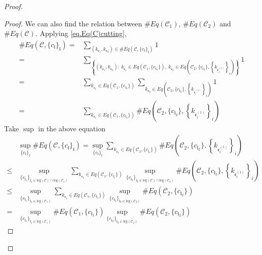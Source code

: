 \begin{proof}
\begin{proof}
We can also find the relation between $\#Eq(\mathcal{C}_1)$, $\#Eq(\mathcal{C}_2)$ and $\#Eq(\mathcal{C})$. Applying \eqref{eq.Eq(C)cutting},
\begin{equation}
\begin{split}
    \#Eq(\mathcal{C},\{c_{\mathfrak{l}}\}_{\mathfrak{l}})=&\sum_{(k_{\mathfrak{e}_1},k_{\mathfrak{e}_{2}})\in \#Eq(\mathcal{C},\{c_{\mathfrak{l}}\}_{\mathfrak{l}})} 1
    \\
    =&\sum_{\left\{(k_{\mathfrak{e}_1},k_{\mathfrak{e}_{2}}):\ k_{\mathfrak{e}_1}\in Eq(\mathcal{C}_1,\{c_{\mathfrak{l}_1}\}),\  k_{\mathfrak{e}_{2}}\in Eq\left(\mathcal{C}_{2}, \{c_{\mathfrak{l}_2}\}, \left\{k_{\mathfrak{e}_{i}^{(1)}}\right\}_{i}\right)\right\}} 1
    \\
    =&\sum_{k_{\mathfrak{e}_1}\in Eq(\mathcal{C}_1,\{c_{\mathfrak{l}_1}\})} \sum_{k_{\mathfrak{e}_{2}}\in Eq\left(\mathcal{C}_{2}, \{c_{\mathfrak{l}_2}\}, \left\{k_{\mathfrak{e}_{i}^{(1)}}\right\}_{i}\right)} 1
    \\
    =&\sum_{k_{\mathfrak{e}_1}\in Eq(\mathcal{C}_1,\{c_{\mathfrak{l}_1}\})} \# Eq\left(\mathcal{C}_{2}, \{c_{\mathfrak{l}_2}\}, \left\{k_{\mathfrak{e}_{i}^{(1)}}\right\}_{i}\right)
\end{split}
\end{equation}
Take $\sup$ in the above equation
\begin{equation}
\begin{split}
    &\sup_{\{c_{\mathfrak{l}}\}_{\mathfrak{l}}}\#Eq(\mathcal{C},\{c_{\mathfrak{l}}\}_{\mathfrak{l}})
    =\sup_{\{c_{\mathfrak{l}}\}_{\mathfrak{l}}}\sum_{k_{\mathfrak{e}_1}\in Eq(\mathcal{C}_1,\{c_{\mathfrak{l}_1}\})} \# Eq\left(\mathcal{C}_{2}, \{c_{\mathfrak{l}_2}\}, \left\{k_{\mathfrak{e}_{i}^{(1)}}\right\}_{i}\right)
    \\
    \le &\sup_{\{c_{\mathfrak{l}_1}\}_{\mathfrak{l}_1\in \text{leg}(\mathcal{C})\cap \text{leg}(\mathcal{C}_1)} }\sum_{k_{\mathfrak{e}_1}\in Eq(\mathcal{C}_1,\{c_{\mathfrak{l}_1}\})} \sup_{\{c_{\mathfrak{l}_2}\}_{\mathfrak{l}_2\in \text{leg}(\mathcal{C})\cap \text{leg}(\mathcal{C}_2)} }\# Eq\left(\mathcal{C}_{2}, \{c_{\mathfrak{l}_2}\}, \left\{k_{\mathfrak{e}_{i}^{(1)}}\right\}_{i}\right)
    \\
    \le &\sup_{\{c_{\mathfrak{l}_1}\}_{\mathfrak{l}_1\in \text{leg}(\mathcal{C}_1)} }\sum_{k_{\mathfrak{e}_1}\in Eq(\mathcal{C}_1,\{c_{\mathfrak{l}_1}\})} \sup_{\{c_{\mathfrak{l}_2}\}_{\mathfrak{l}_2\in \text{leg}(\mathcal{C}_2)} }\# Eq(\mathcal{C}_{2}, \{c_{\mathfrak{l}_2}\})
    \\
    = &\sup_{\{c_{\mathfrak{l}_1}\}_{\mathfrak{l}_1\in \text{leg}(\mathcal{C}_1)} } \# Eq(\mathcal{C}_1,\{c_{\mathfrak{l}_1}\}) \sup_{\{c_{\mathfrak{l}_2}\}_{\mathfrak{l}_2\in \text{leg}(\mathcal{C}_2)} }\# Eq(\mathcal{C}_{2}, \{c_{\mathfrak{l}_2}\})
\end{split}
\end{equation}


\end{proof}
\end{proof}
